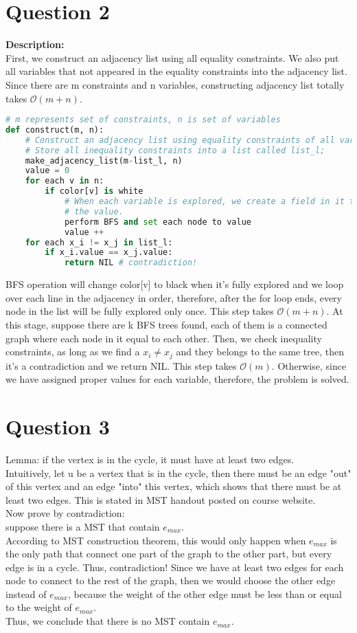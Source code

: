 \documentclass[10pt]{article}
\begin{document}
\section*{Question 2}
\textbf{Description:}\\
 First, we construct an adjacency list using all equality constraints. We also put all variables that not appeared in the equality constraints into the adjacency list. Since there are m constraints and n variables, constructing adjacency list totally takes $\mathcal{O}(m+n)$.\\
\begin{lstlisting}[language=Python]
# m represents set of constraints, n is set of variables
def construct(m, n):
	# Construct an adjacency list using equality constraints of all variables;
	# Store all inequality constraints into a list called list_l;
	make_adjacency_list(m-list_l, n)
	value = 0
	for each v in n:
		if color[v] is white
			# When each variable is explored, we create a field in it to store
			# the value.
			perform BFS and set each node to value
			value ++
	for each x_i != x_j in list_l:
		if x_i.value == x_j.value:
			return NIL # contradiction!
\end{lstlisting}
BFS operation will change color[v] to black when it's fully explored and we loop over each line in the adjacency in order, therefore, after the for loop ends, every node in the list will be fully explored only once. This step takes $\mathcal{O}(m+n)$. At this stage, suppose there are k BFS trees found, each of them is a connected graph where each node in it equal to each other. Then, we check inequality constraints, as long as we find a $x_i \neq x_j$ and they belongs to the same tree, then it's a contradiction and we return NIL. This step takes $\mathcal{O}(m)$. Otherwise, since we have assigned proper values for each variable, therefore, the problem is solved.
\section*{Question 3}
Lemma: if the vertex is in the cycle, it must have at least two edges.\\
Intuitively, let u be a vertex that is in the cycle, then there must be an edge "out" of this vertex and an edge "into" this vertex, which shows that there must be at least two edges. This is stated in MST handout posted on course website.\\
Now prove by contradiction:\\
suppose there is a MST that contain $e_{max}$.\\
According to MST construction theorem, this would only happen when $e_{max}$ is the only path that connect one part of the graph to the other part, but every edge is in a cycle. Thus, contradiction! Since we have at least two edges for each node to connect to the rest of the graph, then we would choose the other edge instead of $e_{max}$, because the weight of the other edge must be less than or equal to the weight of $e_{max}$.\\
Thus, we conclude that there is no MST contain $e_{max}$.
\end{document}
